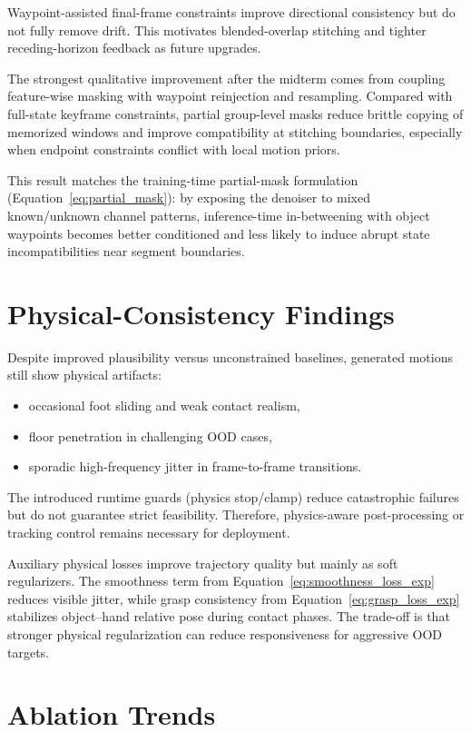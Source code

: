 \begin{itemize}
{Waypoint-assisted final-frame constraints improve directional consistency but do not fully remove drift. This motivates blended-overlap stitching and tighter receding-horizon feedback as future upgrades.

The strongest qualitative improvement after the midterm comes from coupling feature-wise masking with waypoint reinjection and resampling. Compared with full-state keyframe constraints, partial group-level masks reduce brittle copying of memorized windows and improve compatibility at stitching boundaries, especially when endpoint constraints conflict with local motion priors.

This result matches the training-time partial-mask formulation (Equation~\ref{eq:partial_mask}): by exposing the denoiser to mixed known/unknown channel patterns, inference-time in-betweening with object waypoints becomes better conditioned and less likely to induce abrupt state incompatibilities near segment boundaries.

\section{Physical-Consistency Findings}

Despite improved plausibility versus unconstrained baselines, generated motions still show physical artifacts:
\begin{itemize}
	\item occasional foot sliding and weak contact realism,
	\item floor penetration in challenging OOD cases,
	\item sporadic high-frequency jitter in frame-to-frame transitions.
\end{itemize}

The introduced runtime guards (physics stop/clamp) reduce catastrophic failures but do not guarantee strict feasibility. Therefore, physics-aware post-processing or tracking control remains necessary for deployment.

Auxiliary physical losses improve trajectory quality but mainly as soft regularizers. The smoothness term from Equation~\ref{eq:smoothness_loss_exp} reduces visible jitter, while grasp consistency from Equation~\ref{eq:grasp_loss_exp} stabilizes object--hand relative pose during contact phases. The trade-off is that stronger physical regularization can reduce responsiveness for aggressive OOD targets.

\section{Ablation Trends}

}
\end{itemize}
